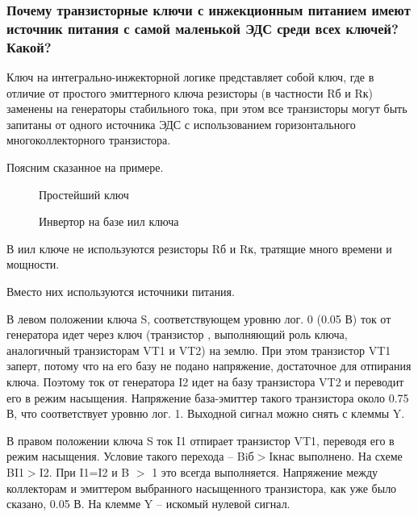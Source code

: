 \subsubsection{Почему транзисторные ключи с инжекционным питанием имеют источник питания с самой маленькой ЭДС среди всех ключей? Какой?}

Ключ на интегрально-инжекторной логике представляет собой ключ, где в отличие от простого эмиттерного ключа резисторы (в частности Rб и Rк) заменены на генераторы стабильного тока, при этом все транзисторы могут быть запитаны от одного источника ЭДС с использованием горизонтального многоколлекторного транзистора.

Поясним сказанное на примере.

\begin{center}
	\begin{figure}[h!]
		\caption{Простейший ключ}	
		\label{iil1}
	\end{figure}
\end{center}

 

\begin{center}
	\begin{figure}[h!]
		\caption{Инвертор на базе иил ключа}	
		\label{iil3}
	\end{figure}
\end{center}



В иил ключе не используются резисторы Rб и Rк, тратящие много времени и мощности. 

Вместо них используются источники питания. 

В левом положении ключа S, соответствующем уровню  лог. 0 (0.05 В) ток от генератора идет через ключ (транзистор , выполняющий роль ключа, аналогичный транзисторам VT1 и VT2) на землю. При этом транзистор VT1 заперт, потому что на его базу не подано напряжение, достаточное для отпирания ключа. Поэтому ток от генератора I2 идет на базу транзистора VT2 и переводит его в режим насыщения. Напряжение база-эмиттер такого транзистора около 0.75 В, что соответствует уровню лог. 1. Выходной сигнал можно снять с клеммы Y.

В правом положении ключа S ток I1 отпирает транзистор VT1, переводя его в режим насыщения. Условие такого перехода -- Biб$>$Iкнас выполнено. На схеме BI1$>$I2. При I1=I2 и B $>$ 1 это всегда выполняется. Напряжение между коллекторам и эмиттером выбранного насыщенного транзистора, как уже было сказано, 0.05 В. На клемме Y -- искомый нулевой сигнал.


